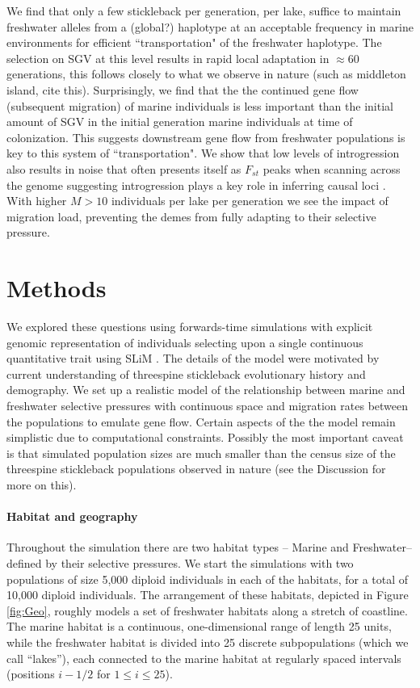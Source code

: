 \documentclass{article}
\begin{document}
We find that only a few stickleback per generation, per lake, 
suffice to maintain freshwater alleles from a (global?) haplotype at an acceptable frequency in marine environments for efficient ``transportation" of the freshwater haplotype.
The selection on SGV at this level results in rapid local adaptation in $\approx 60$ generations, this follows closely to what we observe in nature (such as middleton island, cite this).
Surprisingly, we find that the the continued gene flow (subsequent migration) of marine individuals is less important than the initial amount of SGV in the initial generation marine individuals at time of colonization.
This suggests downstream gene flow from freshwater populations is key to this system of ``transportation".
We show that low levels of introgression also results in noise that often presents itself as $F_{st}$ peaks when scanning across the genome suggesting introgression plays a key role in inferring causal loci . 
With higher $M > 10$ individuals per lake per generation we see the impact of migration load, preventing the demes from fully adapting to their selective pressure.

\section*{Methods}

We explored these questions using forwards-time simulations with explicit genomic representation of individuals selecting upon a single continuous quantitative trait using SLiM \citep{haller2017slim,haller2018slim3}.
The details of the model were motivated by current understanding of threespine stickleback evolutionary history and demography.
We set up a realistic model of the relationship between marine and freshwater selective pressures with continuous space and migration rates between the populations to emulate gene flow. 
Certain aspects of the the model remain simplistic due to computational constraints.
Possibly the most important caveat is that simulated population sizes are much smaller than the census size of the threespine stickleback populations observed in nature
(see the Discussion for more on this).

\paragraph{Habitat and geography}
Throughout the simulation there are two habitat types -- Marine and Freshwater-- defined by their selective pressures.
We start the simulations with two populations of size 5,000 diploid individuals in each of the habitats, for a total of 10,000 diploid individuals.
The arrangement of these habitats, depicted in Figure \ref{fig:Geo},
roughly models a set of freshwater habitats along a stretch of coastline. 
The marine habitat is a continuous, one-dimensional range of length 25 units,
while the freshwater habitat is divided into 25 discrete subpopulations (which we call ``lakes''),
each connected to the marine habitat at regularly spaced intervals
(positions $i - 1/2$ for $1 \le i \le 25$).
\end{document}
